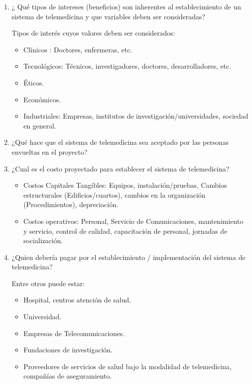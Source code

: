 \begin{enumerate}
\item ¿ Qué tipos de intereses (beneficios) son inherentes al establecimiento de un sistema de telemedicina y que variables deben ser consideradas? 

Tipos de interés cuyos valores deben ser considerados: 

\begin{itemize}
\item Clínicos : Doctores, enfermeras, etc.
\item Tecnológicos: Técnicos, investigadores, doctores, desarrolladores, etc.
\item Éticos.
\item Económicos.
\item Industriales: Empresas, institutos de investigación/universidades, sociedad en general.
\end{itemize}

\item  ¿Qué hace que el sistema de telemedicina sea aceptado por las personas envueltas en el proyecto?

\item ¿Cual es el costo proyectado para establecer el sistema de telemedicina?

\begin{itemize}
\item Costos Capitales Tangibles: Equipos, instalación/pruebas, Cambios estructurales (Edificios/cuartos), cambios en la organización (Procedimientos), depreciación. 
\item Costos operativos: Personal, Servicio de Comunicaciones, mantenimiento y servicio, control de calidad, capacitación de personal, jornadas de socialización.
\end{itemize}

\item ¿Quien debería pagar por el establecimiento / implementación del sistema de telemedicina? 

Entre otros puede estar:

\begin{itemize}
\item Hospital, centros atención de salud.
\item Universidad.
\item Empresas de Telecomunicaciones.
\item Fundaciones de investigación. 
\item Proveedores de servicios de salud bajo la modalidad de telemedicina, compañías de aseguramiento.
\end{itemize}



\end{enumerate}
